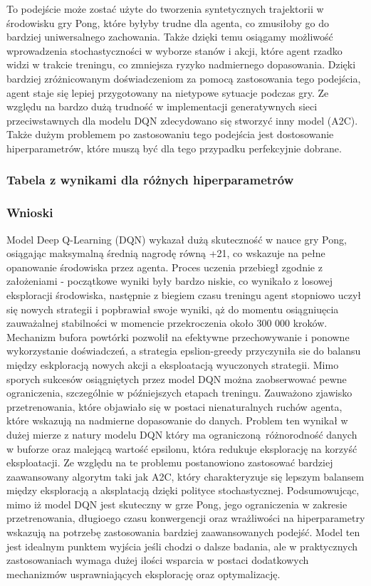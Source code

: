 \documentclass[a4paper, 12pt]{article}
\begin{document}
    To podejście może zostać użyte do tworzenia syntetycznych trajektorii w środowisku gry Pong, które byłyby trudne dla agenta, co zmusiłoby go do bardziej uniwersalnego zachowania.
    Także dzięki temu osiągamy możliwość wprowadzenia stochastyczności w wyborze stanów i akcji, które agent rzadko widzi w trakcie treningu, co zmniejsza ryzyko nadmiernego dopasowania.
    Dzięki bardziej zróżnicowanym doświadczeniom za pomocą zastosowania tego podejścia, agent staje się lepiej przygotowany na nietypowe sytuacje podczas gry. 
    Ze względu na bardzo dużą trudność w implementacji generatywnych sieci przeciwstawnych dla modelu DQN zdecydowano się stworzyć inny model (A2C).
    Także dużym problemem po zastosowaniu tego podejścia jest dostosowanie hiperparametrów, które muszą być dla tego przypadku perfekcyjnie dobrane.
    \subsubsection{Tabela z wynikami dla różnych hiperparametrów}
    \subsubsection{Wnioski}
    Model Deep Q-Learning (DQN) wykazał dużą skuteczność w nauce gry Pong, osiągając maksymalną średnią nagrodę równą +21, co wskazuje na pełne opanowanie środowiska przez agenta.
    Proces uczenia przebiegł zgodnie z założeniami - początkowe wyniki były bardzo niskie, co wynikało z losowej eksploracji środowiska, następnie z biegiem czasu treningu agent stopniowo
    uczył się nowych strategii i popbrawiał swoje wyniki, ąż do momentu osiągniuęcia zauważalnej stabilności w momencie przekroczenia około 300 000 kroków.
    Mechanizm bufora powtórki pozwolił na efektywne przechowywanie i ponowne wykorzystanie doświadczeń, a strategia epslion-greedy przyczyniła sie do balansu między eskploracją 
    nowych akcji a eksploatacją wyuczonych strategii. Mimo sporych sukcesów osiągniętych przez model DQN można zaobserwować pewne ograniczenia, szczególnie w późniejszych etapach treningu.
    Zauważono zjawisko przetrenowania, które objawiało się w postaci nienaturalnych ruchów agenta, które wskazują na nadmierne dopasowanie do danych. Problem ten wynikał w dużej mierze 
    z natury modelu DQN który ma ograniczoną różnorodność danych w buforze oraz malejącą wartość epsilonu, która redukuje eksplorację na korzyść eksploatacji. 
    Ze względu na te problemu postanowiono zastosować bardziej zaawansowany algorytm taki jak A2C, który charakteryzuje się lepszym balansem
    między eksploracją a aksplatacją dzięki polityce stochastycznej. Podsumowujcąc, mimo iż model DQN jest skuteczny w grze Pong, jego ograniczenia
    w zakresie przetrenowania, długioego czasu konwergencji oraz wrażliwości na hiperparametry wskazują na potrzebę zastosowania bardziej zaawansowanych podejść.
    Model ten jest idealnym punktem wyjścia jeśli chodzi o dalsze badania, ale w praktycznych zastosowaniach wymaga dużej ilości wsparcia w postaci dodatkowych 
    mechanizmów usprawniających eksplorację oraz optymalizację.
\end{document}
